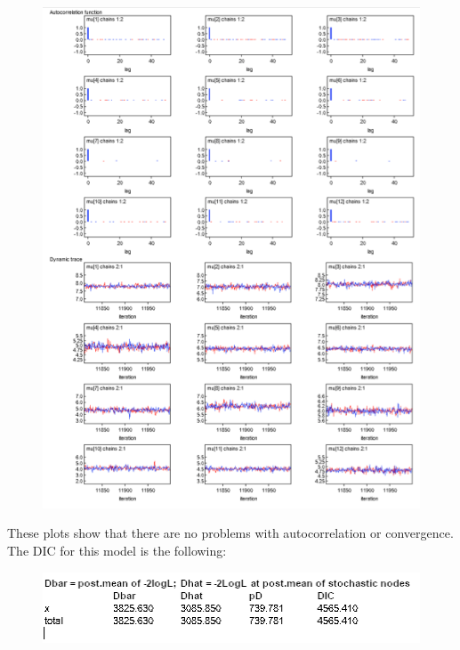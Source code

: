 \documentclass{article}
\begin{document}
\begin{figure}[ht!]
\centering
\includegraphics[width=14cm]{figures/model2_mu.png}
\end{figure}

\newpage
These plots show that there are no problems with autocorrelation or convergence. The DIC for this model is the following:

\begin{figure}[ht!]
\centering
\includegraphics[width=12cm]{figures/model2_DIC.png}
\end{figure}
\end{document}
